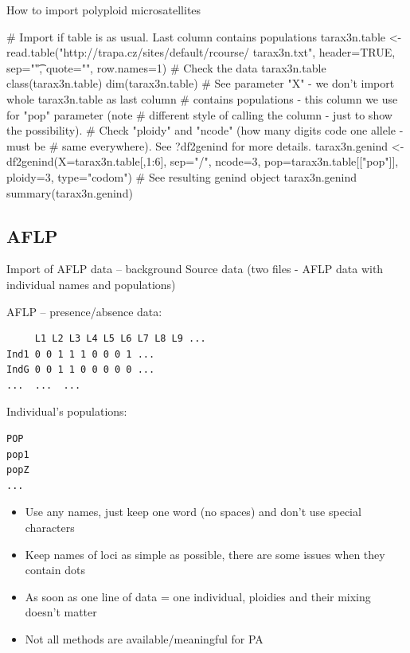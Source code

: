 \documentclass[compress, ucs, xelatex, 11pt, xcolor=svgnames,
  hyperref={
    bookmarks=true,
    unicode=true,
    colorlinks=true,
    pdftitle={Molecular data in R},
    plainpages=false,
    pdfauthor={Vojtech Zeisek},
    pdfsubject={Course about phylogeny and evolution in R},
    pdfcreator={XeLaTeX},
    pdfkeywords={R, evolution, phylogeny, molecular data},
    linkcolor=Tomato,
    anchorcolor=SaddleBrown,
    citecolor=Goldenrod,
    filecolor=DarkMagenta,
    menucolor=Sienna,
    urlcolor=DarkTurquoise,
    pdftex},
  url={hyphens, lowtilde} %
  ]{beamer}
\begin{document}
\begin{frame}[fragile]{How to import polyploid microsatellites}
  \begin{spluscode}
    # Import if table is as usual. Last column contains populations
    tarax3n.table <- read.table("http://trapa.cz/sites/default/rcourse/
      tarax3n.txt", header=TRUE, sep="\t", quote="", row.names=1)
    # Check the data
    tarax3n.table
    class(tarax3n.table)
    dim(tarax3n.table)
    # See parameter "X" - we don't import whole tarax3n.table as last column
    # contains populations - this column we use for "pop" parameter (note
    # different style of calling the column - just to show the possibility).
    # Check "ploidy" and "ncode" (how many digits code one allele - must be
    # same everywhere). See ?df2genind for more details.
    tarax3n.genind <- df2genind(X=tarax3n.table[,1:6], sep="/", ncode=3,
      pop=tarax3n.table[["pop"]], ploidy=3, type="codom")
    # See resulting genind object
    tarax3n.genind
    summary(tarax3n.genind)
  \end{spluscode}
\end{frame}

\subsection{AFLP}

\begin{frame}[fragile]{Import of AFLP data -- background}
Source data (two files - AFLP data with individual names and populations)
\begin{multicols}{2}
AFLP -- presence/absence data:
\begin{verbatim}
     L1 L2 L3 L4 L5 L6 L7 L8 L9 ...
Ind1 0 0 1 1 1 0 0 0 1 ...
IndG 0 0 1 1 0 0 0 0 0 ...
...  ...  ...
\end{verbatim}
Individual's populations:
\begin{verbatim}
POP
pop1
popZ
...
\end{verbatim}
\columnbreak
\begin{itemize}
 \item Use any names, just keep one word (no spaces) and don't use special characters
 \item Keep names of loci as simple as possible, there are some issues when they contain dots
 \item As soon as one line of data = one individual, ploidies and their mixing doesn't matter
 \item Not all methods are available/meaningful for PA
\end{itemize}
\end{multicols}
\end{frame}
\end{document}

